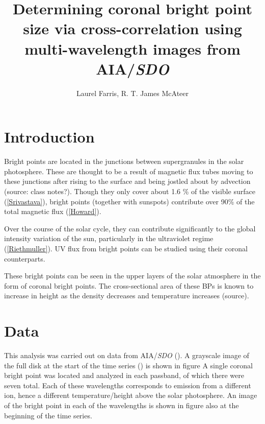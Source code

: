 \documentclass[preprint2]{aastex}
\begin{document}
\title{Determining coronal bright point size via cross-correlation using
multi-wavelength images from AIA/\textit{SDO}}
\author{Laurel Farris, R. T. James McAteer}

\begin{abstract}
\end{abstract}

\section{Introduction}\label{intro}

Bright points are located in the junctions between supergranules in the solar photosphere.
These are thought to be a result of magnetic flux tubes moving to these junctions after
rising to the surface and being jostled about by advection (source: class notes?).
Though they only cover about 1.6 \% of the visible surface (\ref{Srivastava}),
bright points (together with sunspots) contribute over 90\% of the total magnetic
flux (\ref{Howard}).

Over the course of the solar cycle, they can contribute significantly to the
global intensity variation of the sun, particularly in the ultraviolet
regime (\ref{Riethmuller}). UV flux from bright points can be studied using
their coronal counterparts.

These bright points can be seen in the upper layers of the solar atmosphere in
the form of coronal bright points. The cross-sectional area of these BPs is
known to increase in height as the density decreases and temperature increases
(source).


\section{Data}\label{data}
This analysis was carried out on data from AIA/\textit{SDO} (\cite{Lemen}).
A grayscale image of the full disk at the start of the time series () is shown
in figure %
A single coronal bright point was located and analyzed in each passband, of
which there were seven total. Each of these wavelengths corresponds to emission
from a different ion, hence a different temperature/height above the solar
photosphere.
An image of the bright point in each of the wavelengths is shown in figure
also at the beginning of the time series.
\end{document}
